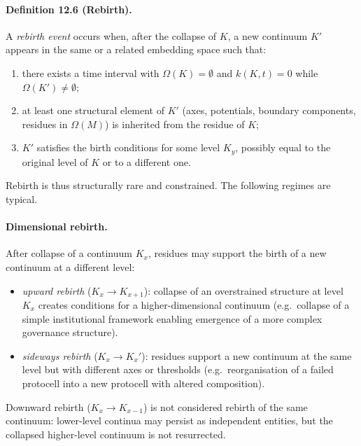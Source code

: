 \paragraph{Definition 12.6 (Rebirth).}
A \emph{rebirth event} occurs when, after the collapse of \(K\),
a new continuum \(K'\) appears in the same or a related embedding space such
that:
\begin{enumerate}
  \item there exists a time interval with
        \(\Omega(K)=\emptyset\) and \(k(K,t)=0\) while
        \(\Omega(K')\neq\emptyset\);
  \item at least one structural element of \(K'\) (axes, potentials, boundary
        components, residues in \(\Omega(M)\)) is inherited from the residue of
        \(K\);
  \item \(K'\) satisfies the birth conditions for some level \(K_y\),
        possibly equal to the original level of \(K\) or to a different one.
\end{enumerate}

Rebirth is thus structurally rare and constrained. The following regimes
are typical.

\paragraph{Dimensional rebirth.}
After collapse of a continuum \(K_x\), residues may support the birth of a
new continuum at a different level:
\begin{itemize}
  \item \emph{upward rebirth} (\(K_x\to K_{x+1}\)):
        collapse of an overstrained structure at level \(K_x\) creates
        conditions for a higher-dimensional continuum (e.g.\ collapse of
        a simple institutional framework enabling emergence of a more complex
        governance structure).
  \item \emph{sideways rebirth} (\(K_x\to K_x'\)):
        residues support a new continuum at the same level but with different
        axes or thresholds (e.g.\ reorganisation of a failed protocell into a
        new protocell with altered composition).
\end{itemize}
Downward rebirth (\(K_x\to K_{x-1}\)) is not considered rebirth of the same
continuum: lower-level continua may persist as independent entities, but the
collapsed higher-level continuum is not resurrected.

